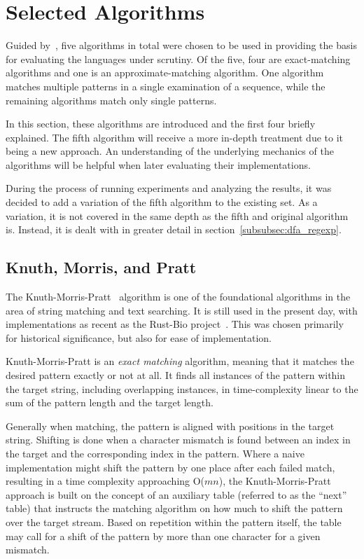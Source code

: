 \section{Selected Algorithms}
\label{sec:algorithms}

Guided by~\cite{rahate}, five algorithms in total were chosen to be used in providing the basis for evaluating the languages under scrutiny. Of the five, four are exact-matching algorithms and one is an approximate-matching algorithm. One algorithm matches multiple patterns in a single examination of a sequence, while the remaining algorithms match only single patterns.

In this section, these algorithms are introduced and the first four briefly explained. The fifth algorithm will receive a more in-depth treatment due to it being a new approach. An understanding of the underlying mechanics of the algorithms will be helpful when later evaluating their implementations.

During the process of running experiments and analyzing the results, it was decided to add a variation of the fifth algorithm to the existing set. As a variation, it is not covered in the same depth as the fifth and original algorithm is. Instead, it is dealt with in greater detail in section~\ref{subsubsec:dfa_regexp}.

\subsection{Knuth, Morris, and Pratt}

The Knuth-Morris-Pratt~\cite{knuth} algorithm is one of the foundational algorithms in the area of string matching and text searching. It is still used in the present day, with implementations as recent as the Rust-Bio project~\cite{rust}. This was chosen primarily for historical significance, but also for ease of implementation.

Knuth-Morris-Pratt is an \textit{exact matching} algorithm, meaning that it matches the desired pattern exactly or not at all. It finds all instances of the pattern within the target string, including overlapping instances, in time-complexity linear to the sum of the pattern length and the target length.

Generally when matching, the pattern is aligned with positions in the target string. Shifting is done when a character mismatch is found between an index in the target and the corresponding index in the pattern. Where a naive implementation might shift the pattern by one place after each failed match, resulting in a time complexity approaching O($mn$), the Knuth-Morris-Pratt approach is built on the concept of an auxiliary table (referred to as the ``next'' table) that instructs the matching algorithm on how much to shift the pattern over the target stream. Based on repetition within the pattern itself, the table may call for a shift of the pattern by more than one character for a given mismatch.

